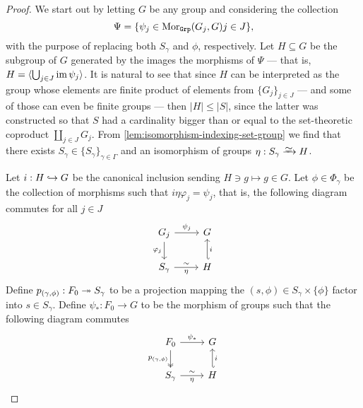 \begin{proof}
    We start out by letting \(G\) be any group and considering the collection
    \[
        \Psi = \{\psi_{j} \in \operatorname{Mor}_{{\texttt{Grp}}}(G_j, G) \relax j \in J\},
    \]
    with the purpose of replacing both \(S_{\gamma}\) and \(\phi\),
    respectively. Let \(H \subseteq G\) be the subgroup of \(G\) generated by the
    images the morphisms of \(\Psi\) --- that is, \(H = \langle \bigcup_{j \in J}
    \operatorname{im} \psi_j \rangle\). It is natural to see that since \(H\) can be interpreted
    as the group whose elements are finite product of elements from \(\{G_{j}\}_{j
    \in J}\) --- and some of those can even be finite groups --- then \(|H| \leq
    |S|\), since the latter was constructed so that \(S\) had a cardinality bigger
    than or equal to the set-theoretic coproduct \(\coprod_{j \in J} G_j\). From
    \cref{lem:isomorphism-indexing-set-group} we find that there exists \(S_{\gamma}
    \in \{S_{\gamma}\}_{\gamma \in \Gamma}\) and an isomorphism of groups \(\eta:
    S_{\gamma} \isoto H\).

    Let \(i: H \hookrightarrow G\) be the canonical inclusion sending \(H \ni g \mapsto g \in
    G\). Let \(\phi \in \Phi_{\gamma}\) be the collection of morphisms such that \(i
    \eta \varphi_j = \psi_j\), that is, the following diagram commutes for all \(j
    \in J\)
    \begin{equation*}
        \label{eq:commutative-varphi-eta}
        \begin{tikzcd}
            G_j \ar[r, "\psi_j"] \ar[d, swap, "\varphi_j"] &G \\
            S_{\gamma} \ar[r, "\eta"', "\sim"] &H \ar[u, hook', swap, "i"]
        \end{tikzcd}
    \end{equation*}
    Define \(p_{(\gamma, \phi)}: F_0 \twoheadrightarrow S_{\gamma}\) to be a projection mapping
    the \((s, \phi) \in S_{\gamma} \times \{\phi\}\) factor into \(s \in
    S_{\gamma}\). Define \(\psi_{*}: F_0 \to G\) to be the morphism of groups such
    that the following diagram commutes
    \begin{equation*}
        \label{eq:commutative-psi-eta}
        \begin{tikzcd}
            F_0 \ar[d, two heads, swap, "p_{(\gamma, \phi)}"] \ar[r, "\psi_{*}"] &G \\
            S_{\gamma} \ar[r, "\sim", "\eta"'] &H \ar[u, hook', "i"']
        \end{tikzcd}
    \end{equation*}


\end{proof}
